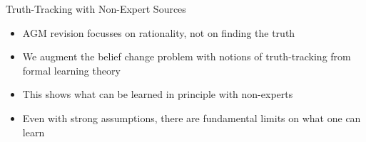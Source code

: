 \documentclass[10pt]{beamer}
\begin{document}
\begin{frame}{Truth-Tracking with Non-Expert Sources}
    \begin{itemize}
        \item AGM revision focusses on rationality, not on \alert{finding the
              truth}
        \item We augment the belief change problem with notions of
              truth-tracking from formal learning theory
        \item This shows what can be learned in principle with non-experts
        \item Even with strong assumptions, there are fundamental limits on
              what one can learn
    \end{itemize}
\end{frame}
\end{document}
